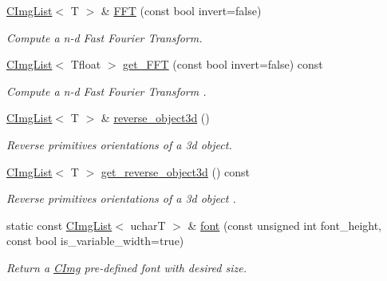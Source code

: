 \begin{DoxyCompactItemize}
\hyperlink{structcimg__library__suffixed_1_1CImgList}{C\+Img\+List}$<$ T $>$ \& \hyperlink{structcimg__library__suffixed_1_1CImgList_aa37f7088060aaa43e50b33fbde5409bb}{F\+FT} (const bool invert=false)
\begin{DoxyCompactList}\small\item\em Compute a n-\/d Fast Fourier Transform. \end{DoxyCompactList}\item 
\mbox{\label{structcimg__library__suffixed_1_1CImgList_abbfcb0dc3fecda40d7a5636171a15b5d}} 
\hyperlink{structcimg__library__suffixed_1_1CImgList}{C\+Img\+List}$<$ Tfloat $>$ \hyperlink{structcimg__library__suffixed_1_1CImgList_abbfcb0dc3fecda40d7a5636171a15b5d}{get\+\_\+\+F\+FT} (const bool invert=false) const
\begin{DoxyCompactList}\small\item\em Compute a n-\/d Fast Fourier Transform . \end{DoxyCompactList}\item 
\mbox{\label{structcimg__library__suffixed_1_1CImgList_ac71b38d55035c32a17e94c8e634fac4b}} 
\hyperlink{structcimg__library__suffixed_1_1CImgList}{C\+Img\+List}$<$ T $>$ \& \hyperlink{structcimg__library__suffixed_1_1CImgList_ac71b38d55035c32a17e94c8e634fac4b}{reverse\+\_\+object3d} ()
\begin{DoxyCompactList}\small\item\em Reverse primitives orientations of a 3d object. \end{DoxyCompactList}\item 
\mbox{\label{structcimg__library__suffixed_1_1CImgList_a4eda742fb0c915ef14c76dadf369554a}} 
\hyperlink{structcimg__library__suffixed_1_1CImgList}{C\+Img\+List}$<$ T $>$ \hyperlink{structcimg__library__suffixed_1_1CImgList_a4eda742fb0c915ef14c76dadf369554a}{get\+\_\+reverse\+\_\+object3d} () const
\begin{DoxyCompactList}\small\item\em Reverse primitives orientations of a 3d object . \end{DoxyCompactList}\item 
static const \hyperlink{structcimg__library__suffixed_1_1CImgList}{C\+Img\+List}$<$ ucharT $>$ \& \hyperlink{structcimg__library__suffixed_1_1CImgList_aeb4a6463a473fa5935f69534ca1a49c8}{font} (const unsigned int font\+\_\+height, const bool is\+\_\+variable\+\_\+width=true)
\begin{DoxyCompactList}\small\item\em Return a \hyperlink{structcimg__library__suffixed_1_1CImg}{C\+Img} pre-\/defined font with desired size. \end{DoxyCompactList}\end{DoxyCompactItemize}


